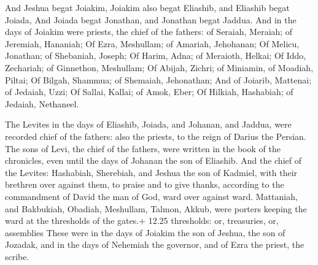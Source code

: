 And Jeshua begat Joiakim, Joiakim also begat Eliashib,
and Eliashib begat Joiada,  And Joiada begat Jonathan, and
Jonathan begat Jaddua.  And in the days of Joiakim were
priests, the chief of the fathers: of Seraiah, Meraiah; of Jeremiah,
Hananiah;  Of Ezra, Meshullam; of Amariah, Jehohanan;
 Of Melicu, Jonathan; of Shebaniah, Joseph; 
Of Harim, Adna; of Meraioth, Helkai;  Of Iddo, Zechariah;
of Ginnethon, Meshullam;  Of Abijah, Zichri; of Miniamin,
of Moadiah, Piltai;  Of Bilgah, Shammua; of Shemaiah,
Jehonathan;  And of Joiarib, Mattenai; of Jedaiah, Uzzi;
 Of Sallai, Kallai; of Amok, Eber;  Of
Hilkiah, Hashabiah; of Jedaiah, Nethaneel.

 The Levites in the days of Eliashib, Joiada, and
Johanan, and Jaddua, were recorded chief of the fathers: also the
priests, to the reign of Darius the Persian.  The sons of
Levi, the chief of the fathers, were written in the book of the
chronicles, even until the days of Johanan the son of Eliashib.
 And the chief of the Levites: Hashabiah, Sherebiah, and
Jeshua the son of Kadmiel, with their brethren over against them, to
praise and to give thanks, according to the commandment of David the man
of God, ward over against ward.  Mattaniah, and Bakbukiah,
Obadiah, Meshullam, Talmon, Akkub, were porters keeping the ward at the
thresholds of the gates.+ 12.25 thresholds: or, treasuries, or,
assemblies  These were in the days of Joiakim the son of
Jeshua, the son of Jozadak, and in the days of Nehemiah the governor,
and of Ezra the priest, the scribe.

